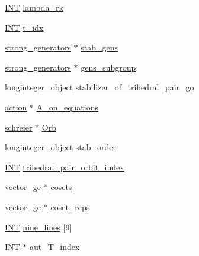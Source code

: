 \begin{DoxyCompactItemize}
\item 
\mbox{\hyperlink{galois_8h_a09fddde158a3a20bd2dcadb609de11dc}{I\+NT}} \mbox{\hyperlink{classarc__lifting_afe80e5706200516c5f094e32a7c0d174}{lambda\+\_\+rk}}
\item 
\mbox{\hyperlink{galois_8h_a09fddde158a3a20bd2dcadb609de11dc}{I\+NT}} \mbox{\hyperlink{classarc__lifting_a8ed05865f33d5622448712fed8e1955b}{t\+\_\+idx}}
\item 
\mbox{\hyperlink{classstrong__generators}{strong\+\_\+generators}} $\ast$ \mbox{\hyperlink{classarc__lifting_a6cbedb70bf148679b845dd4acd54ac1b}{stab\+\_\+gens}}
\item 
\mbox{\hyperlink{classstrong__generators}{strong\+\_\+generators}} $\ast$ \mbox{\hyperlink{classarc__lifting_a3111533ade30517e34a2115136c20e28}{gens\+\_\+subgroup}}
\item 
\mbox{\hyperlink{classlonginteger__object}{longinteger\+\_\+object}} \mbox{\hyperlink{classarc__lifting_adcc7268193f391a65c7d8c9299eaca03}{stabilizer\+\_\+of\+\_\+trihedral\+\_\+pair\+\_\+go}}
\item 
\mbox{\hyperlink{classaction}{action}} $\ast$ \mbox{\hyperlink{classarc__lifting_a4746681609a2b85ddd938ed84fd5542e}{A\+\_\+on\+\_\+equations}}
\item 
\mbox{\hyperlink{classschreier}{schreier}} $\ast$ \mbox{\hyperlink{classarc__lifting_a3de1bd1460585c92a0545bb3ada0af6e}{Orb}}
\item 
\mbox{\hyperlink{classlonginteger__object}{longinteger\+\_\+object}} \mbox{\hyperlink{classarc__lifting_a7e68795cf624847d63b5cd111d2e8baa}{stab\+\_\+order}}
\item 
\mbox{\hyperlink{galois_8h_a09fddde158a3a20bd2dcadb609de11dc}{I\+NT}} \mbox{\hyperlink{classarc__lifting_aa3e2a745c4daed0df0d6bc817ff6d4de}{trihedral\+\_\+pair\+\_\+orbit\+\_\+index}}
\item 
\mbox{\hyperlink{classvector__ge}{vector\+\_\+ge}} $\ast$ \mbox{\hyperlink{classarc__lifting_ad59546693cc6e71f55121989a64e8c7f}{cosets}}
\item 
\mbox{\hyperlink{classvector__ge}{vector\+\_\+ge}} $\ast$ \mbox{\hyperlink{classarc__lifting_ab36fc7dfef2d1ef8ea7bffae42843d0e}{coset\+\_\+reps}}
\item 
\mbox{\hyperlink{galois_8h_a09fddde158a3a20bd2dcadb609de11dc}{I\+NT}} \mbox{\hyperlink{classarc__lifting_a70a68ed6088bd9e1c8c88683abc2b299}{nine\+\_\+lines}} \mbox{[}9\mbox{]}
\item 
\mbox{\hyperlink{galois_8h_a09fddde158a3a20bd2dcadb609de11dc}{I\+NT}} $\ast$ \mbox{\hyperlink{classarc__lifting_a2645b409a7ffa289539587dbfa89d466}{aut\+\_\+\+T\+\_\+index}}

\end{DoxyCompactItemize}
